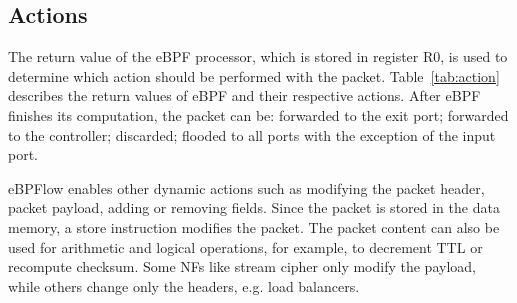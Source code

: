 \subsection{Actions}
\label{secsec:actions}

\begin{table}[tb]
\centering
\caption{Action performed on the packets.}
\label{tab:action}
\end{table}


The return value of the eBPF processor, which is stored in register R0, is used to determine which action should be performed with the packet. Table~\ref{tab:action} describes the return values of eBPF and their respective actions. After eBPF finishes its computation, the packet can be: forwarded to the exit port; forwarded to the controller; discarded; flooded to all ports with the exception of the input port.


eBPFlow enables other dynamic actions such as modifying the packet header, packet payload, adding or removing fields.
Since the packet is stored in the data memory, a store instruction modifies the packet. The packet content can also be used for arithmetic and logical operations, for example, to decrement TTL or recompute checksum.
Some NFs like stream cipher only modify the payload, while others change only the headers, e.g. load balancers. 

